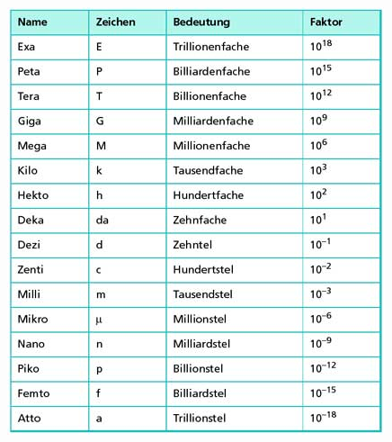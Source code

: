 \documentclass[11pt]{article}
\begin{document}
\begin{minipage}{0.3\textwidth}
\includegraphics[scale=0.40]{Zehnerpotenzen.jpg}

\end{minipage}%
\end{document}
